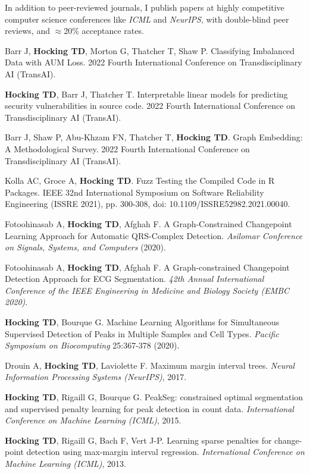 \documentclass[margin,line]{res}
\begin{document}
\begin{resume}
In addition to peer-reviewed journals, I publish papers at highly
competitive computer science conferences like {\it ICML} and {\it
  NeurIPS}, with double-blind peer reviews, and $\approx$20\%
acceptance rates.

Barr J, {\bf Hocking TD}, Morton G, Thatcher T, Shaw P. Classifying
Imbalanced Data with AUM Loss. 2022 Fourth International Conference on
Transdisciplinary AI (TransAI). 

{\bf Hocking TD}, Barr J, Thatcher T. Interpretable linear models for predicting security vulnerabilities in source code. 2022 Fourth International Conference on Transdisciplinary AI (TransAI). 

Barr J, Shaw P, Abu-Khzam FN, Thatcher T, {\bf Hocking TD}. Graph
Embedding: A Methodological Survey. 2022 Fourth International
Conference on Transdisciplinary AI (TransAI). 

Kolla AC, Groce A, {\bf Hocking TD}. Fuzz Testing the Compiled Code in
R Packages. IEEE 32nd International Symposium on Software
Reliability Engineering (ISSRE 2021), pp. 300-308, doi:
10.1109/ISSRE52982.2021.00040.

Fotoohinasab A, {\bf Hocking TD}, Afghah F. A Graph-Constrained
Changepoint Learning Approach for Automatic QRS-Complex
Detection. {\it Asilomar Conference on Signals, Systems, and
  Computers} (2020).

Fotoohinasab A, {\bf Hocking TD}, Afghah F. A Graph-constrained
Changepoint Detection Approach for ECG Segmentation. 
{\it 42th Annual International Conference of the IEEE Engineering in
  Medicine and Biology Society (EMBC 2020)}.

{\bf Hocking TD}, Bourque G. Machine Learning Algorithms for
Simultaneous Supervised Detection of Peaks in Multiple Samples and
Cell Types. {\it Pacific Symposium on Biocomputing} 25:367-378 (2020).

Drouin A, {\bf Hocking TD}, Laviolette F. Maximum margin interval
trees. {\it Neural Information Processing Systems (NeurIPS)}, 2017.

{\bf Hocking TD}, Rigaill G, Bourque G. PeakSeg: constrained optimal
segmentation and supervised penalty learning for peak detection in
count data. {\it International Conference on Machine Learning (ICML)},
2015.

{\bf Hocking TD}, Rigaill G, Bach F, Vert J-P. Learning sparse
penalties for change-point detection using max-margin interval
regression. {\it International Conference on Machine Learning (ICML)}, 2013.


\end{resume}
\end{document}
